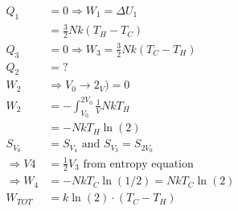 \documentclass[a4paper, 11pt]{article}
\begin{document}
	\begin{align*}
		Q_1 &= 0 \Rightarrow W_1 = \Delta U_1 \\ 
			&= \frac{3}{2}Nk(T_H-T_C) \\ 
		Q_3 &= 0 \Rightarrow W_3 = \frac{3}{2}Nk(T_C-T_H) \\ 
		Q_2 &= ?\\ 
		W_2 &\Rightarrow V_0\to 2_V)=0 \\ 
		W_2 &= -\int_{V_0}^{2V_0} \frac{1}{V}NkT_H \\ 
			&= -NkT_H\ln(2) \\ 
		S_{V_0} &= S_{V_4} \text{ and } S_{V_3} = S_{2V_0} \\ 
		\Rightarrow V4 &= \frac{1}{2} V_3 \text{ from entropy equation} \\ 
		\Rightarrow W_4 &= -NkT_C\ln(1/2)= NkT_C\ln(2) \\ 
		W_{TOT} &= k\ln(2)\cdot(T_C-T_H)
	\end{align*}
		
		
		
		
		
		
		
		
		
		
		
\end{document}
